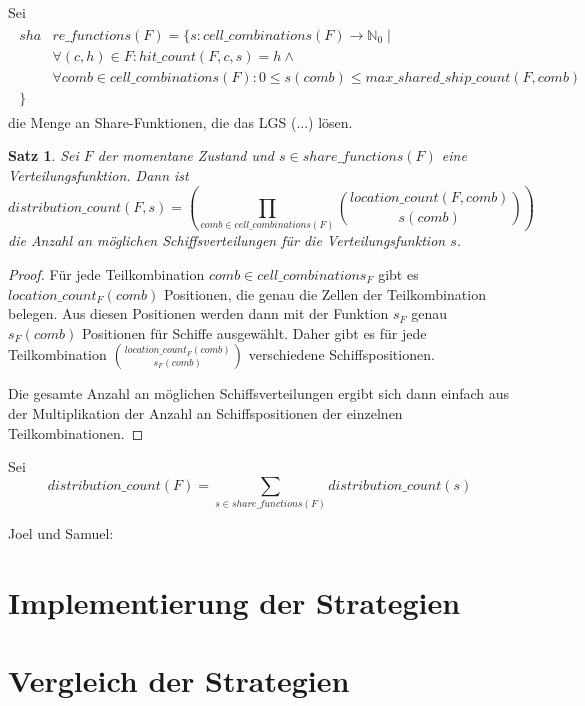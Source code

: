 \documentclass[a4paper,12pt]{llncs}
\newcommand{\N}{{\mathbb{N}}}
\numberwithin{equation}{section}
\newtheorem{satz}{Satz}
\begin{document}
\begin{definition}
Sei
\begin{align}
\begin{split}
sha&re\_functions(F)=\{s \colon cell\_combinations(F) \rightarrow \N_0 \mid\\
&\forall{(c,h) \in F}\colon hit\_count(F, c, s)=h \wedge \\
&\forall{comb \in cell\_combinations(F)} \colon 0 \leq s(comb) \leq max\_shared\_ship\_count(F, comb)\\
\}\;\;\;& \nonumber
\end{split}
\end{align}
die Menge an Share-Funktionen, die das LGS (...) lösen.
\end{definition}

\begin{satz}
Sei $F$ der momentane Zustand und $s \in share\_functions(F)$ eine Verteilungsfunktion.
Dann ist
\[
distribution\_count(F, s)=
\left( \prod_{comb \in cell\_combinations(F)}{{location\_count(F, comb)\choose s(comb)}} \right)
\]
die Anzahl an möglichen Schiffsverteilungen für die Verteilungsfunktion $s$.
\end{satz}

\begin{proof}
Für jede Teilkombination $comb \in cell\_combinations_F$ gibt es $location\_count_F(comb)$ Positionen, die genau die Zellen der Teilkombination belegen. Aus diesen Positionen werden dann mit der Funktion $s_F$ genau $s_F(comb)$ Positionen für Schiffe ausgewählt. Daher gibt es für jede Teilkombination ${location\_count_F(comb)\choose s_F(comb)}$ verschiedene Schiffspositionen.

Die gesamte Anzahl an möglichen Schiffsverteilungen ergibt sich dann einfach aus der Multiplikation der Anzahl an Schiffspositionen der einzelnen Teilkombinationen.
\end{proof}

\begin{definition}
Sei
\[
distribution\_count(F)=\sum_{s \in share\_functions(F)}{distribution\_count(s)}
\]
\end{definition}

Joel und Samuel:

\section{Implementierung der Strategien}

\section{Vergleich der Strategien}


\newpage

 

\end{document}
